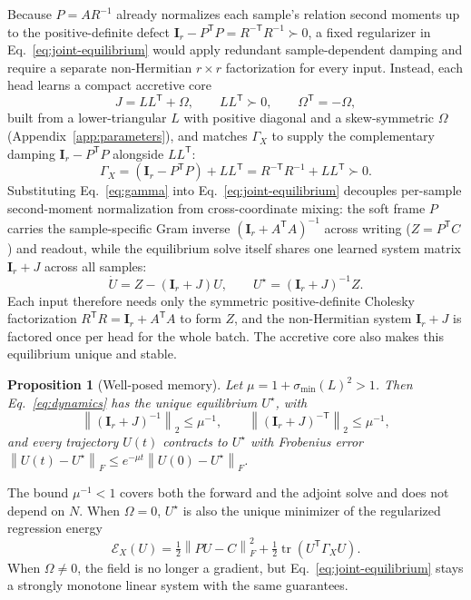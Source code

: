 \documentclass[10pt,twocolumn]{article}
\newtheorem{proposition}[theorem]{Proposition}
\newcommand{\I}{\mathbf{I}}
\newcommand{\T}{\mathsf{T}}
\newcommand{\norm}[1]{\left\lVert #1 \right\rVert}
\newcommand{\tr}{\operatorname{tr}}
\begin{document}
Because $P=AR^{-1}$ already normalizes each sample's relation second moments up
to the positive-definite defect $\I_r-P^\T P=R^{-\T}R^{-1}\succ0$, a fixed
regularizer in Eq.~\eqref{eq:joint-equilibrium} would apply redundant
sample-dependent damping and require a separate non-Hermitian $r\times r$
factorization for every input.
Instead, each head learns a compact accretive core
\begin{equation}
 J=LL^\T+\Omega,\qquad LL^\T\succ0,\qquad\Omega^\T=-\Omega,
 \label{eq:core}
\end{equation}
built from a lower-triangular $L$ with positive diagonal and a skew-symmetric
$\Omega$ \cite{winston2020mondeq} (Appendix~\ref{app:parameters}), and matches
$\Gamma_X$ to supply the complementary damping $\I_r-P^\T P$ alongside $LL^\T$:
\begin{equation}
 \Gamma_X=(\I_r-P^\T P)+LL^\T=R^{-\T}R^{-1}+LL^\T\succ0.
 \label{eq:gamma}
\end{equation}
Substituting Eq.~\eqref{eq:gamma} into Eq.~\eqref{eq:joint-equilibrium}
decouples per-sample second-moment normalization from cross-coordinate mixing:
the soft frame $P$ carries the sample-specific Gram inverse
$(\I_r+A^\T A)^{-1}$ across writing ($Z=P^\T C$) and readout, while the
equilibrium solve itself shares one learned system matrix $\I_r+J$ across all
samples:
\begin{equation}
 \dot U=Z-(\I_r+J)U,\qquad U^\star=(\I_r+J)^{-1}Z.
 \label{eq:dynamics}
\end{equation}
Each input therefore needs only the symmetric positive-definite Cholesky
factorization $R^\T R=\I_r+A^\T A$ to form $Z$, and the non-Hermitian system
$\I_r+J$ is factored once per head for the whole batch.
The accretive core also makes this equilibrium unique and stable.

\begin{proposition}[Well-posed memory]
\label{prop:solve}
Let $\mu=1+\sigma_{\min}(L)^2>1$. Then Eq.~\eqref{eq:dynamics} has the unique
equilibrium $U^\star$, with
\begin{equation}
 \norm{(\I_r+J)^{-1}}_2\le\mu^{-1},\qquad
 \norm{(\I_r+J)^{-\T}}_2\le\mu^{-1},
\end{equation}
and every trajectory $U(t)$ contracts to $U^\star$ with Frobenius error
$\norm{U(t)-U^\star}_F\le e^{-\mu t}\norm{U(0)-U^\star}_F$.
\end{proposition}

The bound $\mu^{-1}<1$ covers both the forward and the adjoint solve and does
not depend on $N$.
When $\Omega=0$, $U^\star$ is also the unique minimizer of the regularized
regression energy
\begin{equation}
 \mathcal E_X(U)=\tfrac12\norm{PU-C}_F^2+\tfrac12\tr(U^\T\Gamma_XU).
 \label{eq:objective}
\end{equation}
When $\Omega\ne0$, the field is no longer a gradient, but
Eq.~\eqref{eq:joint-equilibrium} stays a strongly monotone linear system with
the same guarantees.
\end{document}
